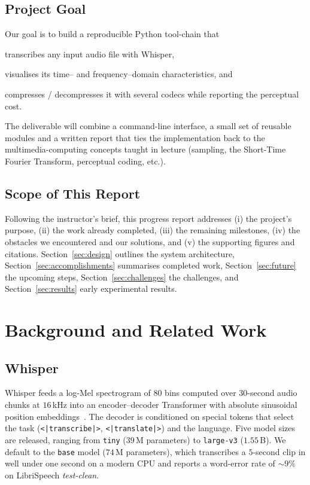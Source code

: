 \documentclass[conference]{IEEEtran}
\begin{document}
\subsection{Project Goal}
Our goal is to build a reproducible Python tool-chain that
\begin{enumerate*}[label=(\alph*)]
  \item transcribes any input audio file with Whisper,
  \item visualises its time-- and frequency--domain characteristics, and
  \item compresses / decompresses it with several codecs while reporting
        the perceptual cost.
\end{enumerate*}
The deliverable will combine a command-line interface, a small set of
reusable modules and a written report that ties the implementation back to
the multimedia-computing concepts taught in lecture (sampling, the
Short-Time Fourier Transform, perceptual coding, etc.).

\subsection{Scope of This Report}
Following the instructor's brief, this progress report addresses
(i) the project's purpose, (ii) the work already completed, (iii) the
remaining milestones, (iv) the obstacles we encountered and our solutions,
and (v) the supporting figures and citations.  Section~\ref{sec:design}
outlines the system architecture, Section~\ref{sec:accomplishments}
summarises completed work, Section~\ref{sec:future} the upcoming steps,
Section~\ref{sec:challenges} the challenges, and
Section~\ref{sec:results} early experimental results.

\section{Background and Related Work}\label{sec:background}
\subsection{Whisper}
Whisper feeds a log-Mel spectrogram of $80$ bins computed over $30$-second
audio chunks at $16$\,kHz into an encoder--decoder Transformer with
absolute sinusoidal position embeddings~\cite{radford2022whisper}.  The
decoder is conditioned on special tokens that select the task
(\texttt{<|transcribe|>}, \texttt{<|translate|>}) and the language.
Five model sizes are released, ranging from \texttt{tiny} ($39$\,M
parameters) to \texttt{large-v3} ($1.55$\,B).  We default to the
\texttt{base} model ($74$\,M parameters), which transcribes a
$5$-second clip in well under one second on a modern CPU and reports a
word-error rate of $\sim 9\%$ on LibriSpeech \emph{test-clean}.
\end{document}
